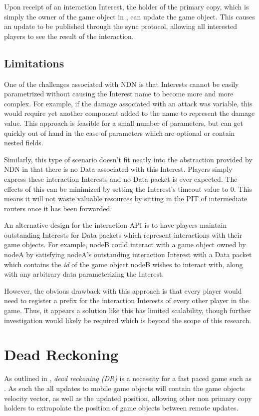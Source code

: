 Upon receipt of an interaction Interest, the holder of the primary copy, which is simply the owner of the game object in \game{}, can update the game object. This causes an update to be published through the sync protocol, allowing all interested players to see the result of the interaction.


\subsection{Limitations}
One of the challenges associated with NDN is that Interests cannot be easily parametrized without causing the Interest name to become more and more complex. For example, if the damage associated with an attack was variable, this would require yet another component added to the name to represent the damage value. This approach is feasible for a small number of parameters, but can get quickly out of hand in the case of parameters which are optional or contain nested fields. 

Similarly, this type of scenario doesn't fit neatly into the abstraction provided by NDN in that there is no Data associated with this Interest. Players simply express these interaction Interests and no Data packet is ever expected. The effects of this can be minimized by setting the Interest's timeout value to 0. This means it will not waste valuable resources by sitting in the PIT of intermediate routers once it has been forwarded.

An alternative design for the interaction API is to have players maintain outstanding Interests for Data packets which represent interactions with their game objects. For example, nodeB could interact with a game object owned by nodeA by satisfying nodeA's outstanding interaction Interest with a Data packet which contains the \textit{id} of the game object nodeB wishes to interact with, along with any arbitrary data parameterizing the Interest. 

However, the obvious drawback with this approach is that every player would need to register a prefix for the interaction Interests of every other player in the game. Thus, it appears a solution like this has limited scalability, though further investigation would likely be required which is beyond the scope of this research. 



\section{Dead Reckoning}\label{sec:des:dr}
As outlined in , \textit{dead reckoning (DR)} is a necessity for a fast paced game such as \game{}. As such the all updates to mobile game objects will contain the game objects velocity vector, as well as the updated position, allowing other non primary copy holders to extrapolate the position of game objects between remote updates.

